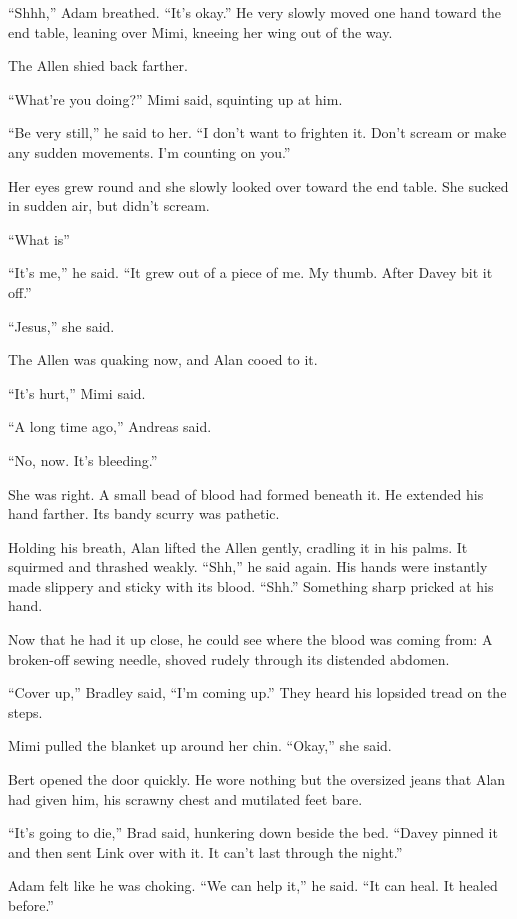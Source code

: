``Shhh,'' Adam breathed.  ``It's okay.'' He very slowly moved one hand
toward the end table, leaning over Mimi, kneeing her wing out of the
way. 

The Allen shied back farther. 

``What're you doing?'' Mimi said, squinting up at him.

``Be very still,'' he said to her.  ``I don't want to frighten it. 
Don't scream or make any sudden movements.  I'm counting on you.''

Her eyes grew round and she slowly looked over toward the end table. 
She sucked in sudden air, but didn't scream.

``What is\dash{}''

``It's me,'' he said.  ``It grew out of a piece of me.  My thumb. 
After Davey bit it off.''

``Jesus,'' she said.

The Allen was quaking now, and Alan cooed to it. 

``It's hurt,'' Mimi said.

``A long time ago,'' Andreas said.

``No, now.  It's bleeding.''

She was right.  A small bead of blood had formed beneath it.  He
extended his hand farther.  Its bandy scurry was pathetic.

Holding his breath, Alan lifted the Allen gently, cradling it in his
palms.  It squirmed and thrashed weakly.  ``Shh,'' he said again.  His
hands were instantly made slippery and sticky with its blood. 
``Shh.'' Something sharp pricked at his hand.

Now that he had it up close, he could see where the blood was coming
from:  A broken-off sewing needle, shoved rudely through its distended
abdomen.

``Cover up,'' Bradley said, ``I'm coming up.'' They heard his lopsided
tread on the steps.

Mimi pulled the blanket up around her chin.  ``Okay,'' she said.

Bert opened the door quickly.  He wore nothing but the oversized jeans
that Alan had given him, his scrawny chest and mutilated feet bare.

``It's going to die,'' Brad said, hunkering down beside the bed. 
``Davey pinned it and then sent Link over with it.  It can't last
through the night.''

Adam felt like he was choking.  ``We can help it,'' he said.  ``It can
heal.  It healed before.''

